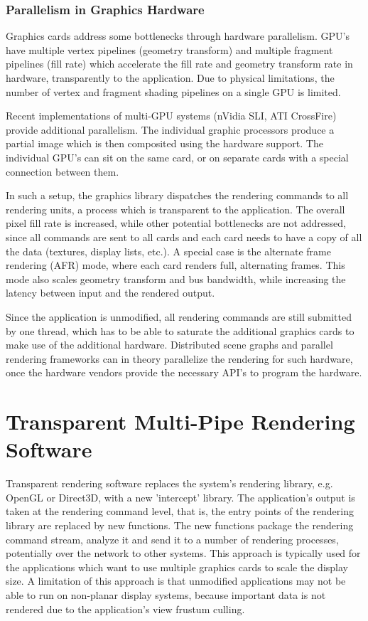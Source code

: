 \documentclass[10pt,a4paper]{scrartcl}
\begin{document}
\subsubsection{Parallelism in Graphics Hardware}
Graphics cards address some bottlenecks through hardware
parallelism. GPU's have multiple vertex pipelines (geometry
transform) and multiple fragment pipelines (fill rate) which
accelerate the fill rate and geometry transform rate in hardware,
transparently to the application. Due to physical limitations, the
number of vertex and fragment shading pipelines on a single GPU is limited.

Recent implementations of multi-GPU systems (nVidia SLI, ATI CrossFire)
provide additional parallelism. The individual graphic processors
produce a partial image which is then composited using the hardware
support. The individual GPU's can sit on the same card, or on separate
cards with a special connection between them.

In such a setup, the graphics library dispatches the rendering commands to all
rendering units, a process which is transparent to the application. The overall
pixel fill rate is increased, while other potential bottlenecks are not
addressed, since all commands are sent to all cards and each card needs to
have a copy of all the data (textures, display lists, etc.). A special
case is the alternate frame rendering (AFR) mode,
where each card renders full, alternating frames. This mode also scales
geometry transform and bus bandwidth, while increasing the latency
between input and the rendered output.

Since the application is unmodified, all rendering commands are still
submitted by one thread, which has to be able to saturate the additional
graphics cards to make use of the additional hardware. Distributed scene
graphs and parallel rendering frameworks can in theory parallelize the
rendering for such hardware, once the hardware vendors provide the
necessary API's to program the hardware.

\section{Transparent Multi-Pipe Rendering Software}
Transparent rendering software replaces the system's rendering library,
e.g. OpenGL or Direct3D, with a new 'intercept' library. The
application's output is taken at the rendering command level, that is,
the entry points of the rendering library are replaced by new
functions. The new functions package the rendering command stream,
analyze it and send it to a number of rendering processes, potentially
over the network to other systems. This approach is typically used for
the applications which want to use multiple graphics cards to scale the
display size. A limitation of this approach is that unmodified
applications may not be able to run on non-planar display systems,
because important data is not rendered due to the application's view
frustum culling.
\end{document}
